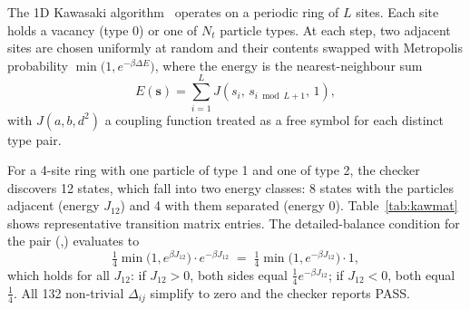 \documentclass[twocolumn,10pt]{article}
\newcommand{\lsite}[1]{\fbox{\ensuremath{\,#1\,}}}
\newcommand{\Mf}[1]{\min\!\bigl(1,e^{#1}\bigr)}
\begin{document}
The 1D Kawasaki algorithm~\cite{Kawasaki1966} operates on a periodic ring of
$L$ sites.  Each site holds a vacancy (type 0) or one of $N_t$ particle
types.  At each step, two adjacent sites are chosen uniformly at random and
their contents swapped with Metropolis probability $\Mf{-\beta\Delta E}$,
where the energy is the nearest-neighbour sum
\begin{equation}
  E(\mathbf{s}) = \sum_{i=1}^{L} J\!\left(s_i,\, s_{i\bmod L+1},\, 1\right),
  \label{eq:kawenergy}
\end{equation}
with $J(a,b,d^2)$ a coupling function treated as a free symbol for each
distinct type pair.

For a 4-site ring with one particle of type 1 and one of type 2, the checker
discovers 12 states, which fall into two energy classes: 8 states with the
particles adjacent (energy $J_{12}$) and 4 with them separated (energy $0$).
Table~\ref{tab:kawmat} shows representative transition matrix entries.  The
detailed-balance condition for the pair
(\lsite{0}\lsite{0}\lsite{1}\lsite{2},\;\lsite{0}\lsite{1}\lsite{0}\lsite{2})
evaluates to
\begin{equation}
  \tfrac{1}{4}\Mf{\beta J_{12}}\cdot e^{-\beta J_{12}} \;=\;
  \tfrac{1}{4}\Mf{-\beta J_{12}}\cdot 1,
\end{equation}
which holds for all $J_{12}$: if $J_{12}>0$, both sides equal
$\tfrac{1}{4}e^{-\beta J_{12}}$; if $J_{12}<0$, both equal $\tfrac{1}{4}$.
All 132 non-trivial $\Delta_{ij}$ simplify to zero and the checker reports
PASS.
\end{document}
